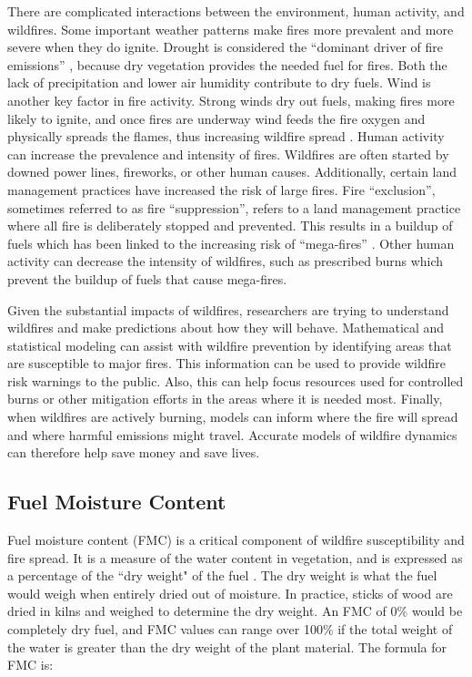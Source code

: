 \documentclass[11pt]{article}%
\begin{document}
There are complicated interactions between the environment, human activity, and wildfires. Some important weather patterns make fires more prevalent and more severe when they do ignite. Drought is considered the “dominant driver of fire emissions” \citep{IPCC-2021-LCI}, because dry vegetation provides the needed fuel for fires. Both the lack of precipitation and lower air humidity contribute to dry fuels. Wind is another key factor in fire activity. Strong winds dry out fuels, making fires more likely to ignite, and once fires are underway wind feeds the fire oxygen and physically spreads the flames, thus increasing wildfire spread \citep{Richardson-2022-GIW}. Human activity can increase the prevalence and intensity of fires. Wildfires are often started by downed power lines, fireworks, or other human causes. Additionally, certain land management practices have increased the risk of large fires. Fire ``exclusion”, sometimes referred to as fire ``suppression”, refers to a land management practice where all fire is deliberately stopped and prevented. This results in a buildup of fuels which has been linked to the increasing risk of ``mega-fires” \citep{Williams-2013-EOH}. Other human activity can decrease the intensity of wildfires, such as prescribed burns which prevent the buildup of fuels that cause mega-fires.

Given the substantial impacts of wildfires, researchers are trying to understand wildfires and make predictions about how they will behave. Mathematical and statistical modeling can assist with wildfire prevention by identifying areas that are susceptible to major fires. This information can be used to provide wildfire risk warnings to the public. Also, this can help focus resources used for controlled burns or other mitigation efforts in the areas where it is needed most. Finally, when wildfires are actively burning, models can inform where the fire will spread and where harmful emissions might travel. Accurate models of wildfire dynamics can therefore help save money and save lives.

\subsection{Fuel Moisture Content}

Fuel moisture content (FMC) is a critical component of wildfire susceptibility and fire spread. It is a measure of the water content in vegetation, and is expressed as a percentage of the ``dry weight" of the fuel \citep{NCEI-2024-DFM}. The dry weight is what the fuel would weigh when entirely dried out of moisture. In practice, sticks of wood are dried in kilns and weighed to determine the dry weight. An FMC of 0\% would be completely dry fuel, and FMC values can range over 100\% if the total weight of the water is greater than the dry weight of the plant material. The formula for FMC is:
\end{document}
